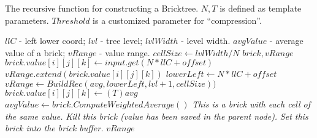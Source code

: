 \vspace{-1em}
\begin{algorithm}
	\caption{The recursive function for constructing a Bricktree. $N,T$ is defined as template parameters. $Threshold$ is a customized parameter for ``compression''.}\label{alg:bricktree}
	\begin{algorithmic}[1]
	    \Require $llC$ - left lower coord; $lvl$ - tree level; $lvlWidth$ - level width.
        \Ensure $avgValue$ - average value of a brick; $vRange$ - value range.
			\State $cellSize \gets lvlWidth / N $
			\State $brick, vRange$
				\State $brick.value[i][j][k] \gets input.get(N * llC + offset)$
				\State $vRange.extend(brick.value[i][j][k])$
			\Else
			    \State $lowerLeft \gets N*llC + offset$
				\State $vRange \gets BuildRec(avg,lowerLeft, lvl+1,cellSize))$
				\State $brick.value[i][j][k] \gets (T)avg$
			\EndIf
			\State $avgValue \gets brick.ComputeWeightedAverage()$
				\State \textit{This is a brick with each cell of the same value.}
				\State \textit{Kill this brick (value has been saved in the parent node).}
			\Else
				\State \textit{Set this brick into the brick buffer.}
			\EndIf
			\Return $vRange$
    	\EndFunction
	\end{algorithmic}
\end{algorithm}





